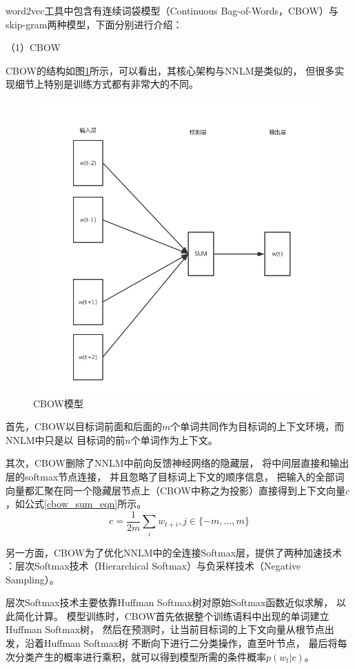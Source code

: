 word2vec工具中包含有连续词袋模型（Continuous Bag-of-Words，CBOW）与
skip-gram两种模型，下面分别进行介绍：

（1）CBOW

CBOW的结构如图\ref{cbow}所示，可以看出，其核心架构与NNLM是类似的，
但很多实现细节上特别是训练方式都有非常大的不同。
\begin{figure}[h]
    \includegraphics[scale=0.6]{picture/cbow.png}
    \caption{CBOW模型}
    \label{cbow}
\end{figure}

首先，CBOW以目标词前面和后面的$m$个单词共同作为目标词的上下文环境，而NNLM中只是以
目标词的前$n$个单词作为上下文。

其次，CBOW删除了NNLM中前向反馈神经网络的隐藏层，
将中间层直接和输出层的softmax节点连接，
并且忽略了目标词上下文的顺序信息，
把输入的全部词向量都汇聚在同一个隐藏层节点上（CBOW中称之为投影）直接得到上下文向量$c$
，如公式\ref{cbow_sum_eqn}所示。
\begin{equation}
    c = \frac{1}{2m}\sum_i w_{t+i}, j\in \{-m,...,m\}
    \label{cbow_sum_eqn}
\end{equation}

另一方面，CBOW为了优化NNLM中的全连接Softmax层，提供了两种加速技术
：层次Softmax技术（Hierarchical Softmax）与负采样技术（Negative Sampling）。

层次Softmax技术主要依靠Huffman Softmax树对原始Softmax函数近似求解，
以此简化计算。
模型训练时，CBOW首先依据整个训练语料中出现的单词建立Huffman Softmax树，
然后在预测时，让当前目标词的上下文向量从根节点出发，沿着Huffman Softmax树
不断向下进行二分类操作，直至叶节点，
最后将每次分类产生的概率进行乘积，就可以得到模型所需的条件概率$p(w_t|c)$。

